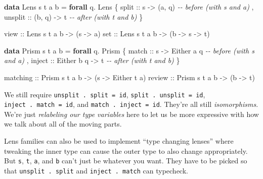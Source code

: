 \documentclass[]{article}
\newenvironment{Shaded}{}{}
\newcommand{\CommentTok}[1]{\textcolor[rgb]{0.38,0.63,0.69}{\textit{#1}}}
\newcommand{\DataTypeTok}[1]{\textcolor[rgb]{0.56,0.13,0.00}{#1}}
\newcommand{\KeywordTok}[1]{\textcolor[rgb]{0.00,0.44,0.13}{\textbf{#1}}}
\newcommand{\NormalTok}[1]{#1}
\newcommand{\OperatorTok}[1]{\textcolor[rgb]{0.40,0.40,0.40}{#1}}
\newcommand{\OtherTok}[1]{\textcolor[rgb]{0.00,0.44,0.13}{#1}}
\begin{document}
\begin{Shaded}
\begin{Highlighting}[]
\KeywordTok{data} \DataTypeTok{Lens}\NormalTok{ s t a b }\OtherTok{=} \KeywordTok{forall}\NormalTok{ q}\OperatorTok{.} \DataTypeTok{Lens}
\NormalTok{    \{}\OtherTok{ split   ::}\NormalTok{ s }\OtherTok{{-}\textgreater{}}\NormalTok{ (a, q)        }\CommentTok{{-}{-} before (with s and a)}
\NormalTok{    ,}\OtherTok{ unsplit ::}\NormalTok{ (b, q) }\OtherTok{{-}\textgreater{}}\NormalTok{ t        }\CommentTok{{-}{-} after  (with t and b)}
\NormalTok{    \}}

\OtherTok{view ::} \DataTypeTok{Lens}\NormalTok{ s t a b }\OtherTok{{-}\textgreater{}}\NormalTok{ (s }\OtherTok{{-}\textgreater{}}\NormalTok{ a)}
\OtherTok{set  ::} \DataTypeTok{Lens}\NormalTok{ s t a b }\OtherTok{{-}\textgreater{}}\NormalTok{ (b }\OtherTok{{-}\textgreater{}}\NormalTok{ s }\OtherTok{{-}\textgreater{}}\NormalTok{ t)}

\KeywordTok{data} \DataTypeTok{Prism}\NormalTok{ s t a b }\OtherTok{=} \KeywordTok{forall}\NormalTok{ q}\OperatorTok{.} \DataTypeTok{Prism}
\NormalTok{    \{}\OtherTok{ match  ::}\NormalTok{ s }\OtherTok{{-}\textgreater{}} \DataTypeTok{Either}\NormalTok{ a q     }\CommentTok{{-}{-} before (with s and a)}
\NormalTok{    ,}\OtherTok{ inject ::} \DataTypeTok{Either}\NormalTok{ b q }\OtherTok{{-}\textgreater{}}\NormalTok{ t     }\CommentTok{{-}{-} after  (with t and b)}
\NormalTok{    \}}

\OtherTok{matching ::} \DataTypeTok{Prism}\NormalTok{ s t a b }\OtherTok{{-}\textgreater{}}\NormalTok{ (s }\OtherTok{{-}\textgreater{}} \DataTypeTok{Either}\NormalTok{ t a)}
\OtherTok{review   ::} \DataTypeTok{Prism}\NormalTok{ s t a b }\OtherTok{{-}\textgreater{}}\NormalTok{ (b }\OtherTok{{-}\textgreater{}}\NormalTok{ t)}
\end{Highlighting}
\end{Shaded}

We still require \texttt{unsplit\ .\ split\ =\ id},
\texttt{split\ .\ unsplit\ =\ id}, \texttt{inject\ .\ match\ =\ id}, and
\texttt{match\ .\ inject\ =\ id}. They're all still \emph{isomorphisms}. We're
just \emph{relabeling our type variables} here to let us be more expressive with
how we talk about all of the moving parts.

Lens families can also be used to implement ``type changing lenses'' where
tweaking the inner type can cause the outer type to also change appropriately.
But \texttt{s}, \texttt{t}, \texttt{a}, and \texttt{b} can't just be whatever
you want. They have to be picked so that \texttt{unsplit\ .\ split} and
\texttt{inject\ .\ match} can typecheck.
\end{document}
